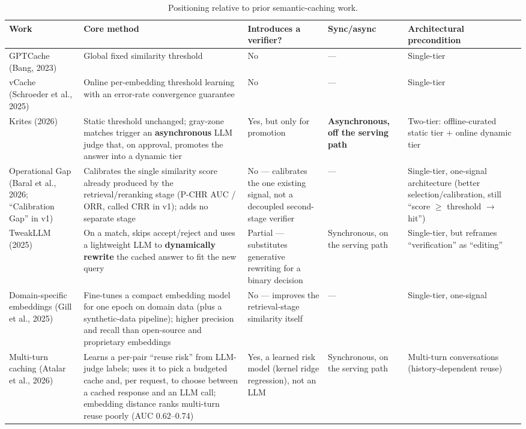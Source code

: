 \documentclass[11pt]{article}
\newenvironment{fittab}{\begin{lrbox}{\fittabbox}}{\end{lrbox}%
  \ifdim\wd\fittabbox>\linewidth\resizebox{\linewidth}{!}{\usebox{\fittabbox}}\else\usebox{\fittabbox}\fi}
\begin{document}
\begin{table}[tbp]
\centering
\footnotesize
\begin{fittab}\begin{tabular}{@{}p{2.1cm}p{3.6cm}p{2.2cm}p{2.2cm}p{3.6cm}@{}}
\toprule
\textbf{Work} & \textbf{Core method} & \textbf{Introduces a verifier?} & \textbf{Sync/async} & \textbf{Architectural precondition} \\
\midrule
GPTCache (Bang, 2023) & Global fixed similarity threshold & No & --- & Single-tier \\
\addlinespace
vCache (Schroeder et al., 2025) & Online per-embedding threshold learning with an error-rate convergence guarantee & No & --- & Single-tier \\
\addlinespace
Krites (2026) & Static threshold unchanged; gray-zone matches trigger an \textbf{asynchronous} LLM judge that, on approval, promotes the answer into a dynamic tier & Yes, but only for promotion & \textbf{Asynchronous, off the serving path} & Two-tier: offline-curated static tier + online dynamic tier \\
\addlinespace
Operational Gap (Baral et al., 2026; ``Calibration Gap'' in v1) & Calibrates the single similarity score already produced by the retrieval/reranking stage (P-CHR AUC / ORR, called CRR in v1); adds no separate stage & No --- calibrates the one existing signal, not a decoupled second-stage verifier & --- & Single-tier, one-signal architecture (better selection/calibration, still ``score $\geq$ threshold $\rightarrow$ hit'') \\
\addlinespace
TweakLLM (2025) & On a match, skips accept/reject and uses a lightweight LLM to \textbf{dynamically rewrite} the cached answer to fit the new query & Partial --- substitutes generative rewriting for a binary decision & Synchronous, on the serving path & Single-tier, but reframes ``verification'' as ``editing'' \\
\addlinespace
Domain-specific embeddings (Gill et al., 2025)~\cite{gill25} & Fine-tunes a compact embedding model for one epoch on domain data (plus a synthetic-data pipeline); higher precision and recall than open-source and proprietary embeddings & No --- improves the retrieval-stage similarity itself & --- & Single-tier, one-signal \\
\addlinespace
Multi-turn caching (Atalar et al., 2026)~\cite{atalar26} & Learns a per-pair ``reuse risk'' from LLM-judge labels; uses it to pick a budgeted cache and, per request, to choose between a cached response and an LLM call; embedding distance ranks multi-turn reuse poorly (AUC 0.62--0.74) & Yes, a learned risk model (kernel ridge regression), not an LLM & Synchronous, on the serving path & Multi-turn conversations (history-dependent reuse) \\
\bottomrule
\end{tabular}\end{fittab}
\caption{Positioning relative to prior semantic-caching work.}
\end{table}
\end{document}
